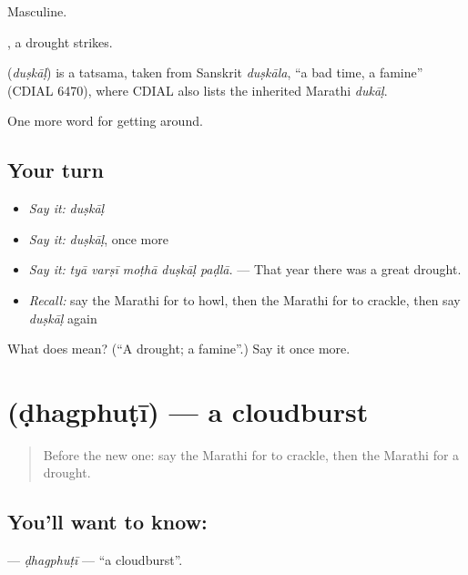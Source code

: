 Masculine.

 , a drought strikes.

\begin{cousinweb}
\textbf{} (\emph{duṣkāḷ}) is a tatsama, taken from Sanskrit \emph{duṣkāla}, \textquotedblleft{}a bad time, a famine\textquotedblright{} (CDIAL 6470), where CDIAL also lists the inherited Marathi \emph{dukāḷ}.
\end{cousinweb}

\begin{grammarlens}[title={What you've built}]
One more word for getting around.
\end{grammarlens}

\subsection*{Your turn}
\begin{itemize}
\raggedright
  \item \emph{Say it:} \emph{duṣkāḷ}
  \item \emph{Say it:} \emph{duṣkāḷ}, once more
  \item \emph{Say it:} \emph{tyā varṣī moṭhā duṣkāḷ paḍlā.} — That year there was a great drought.
  \item \emph{Recall:} say the Marathi for to howl, then the Marathi for to crackle, then say \emph{duṣkāḷ} again
\end{itemize}

\begin{tcolorbox}[breakable,colback=teal!4,colframe=teal!35!black,title={Before you move on}]
What does  mean? (\textquotedblleft{}A drought; a famine\textquotedblright{}.) Say it once more.
\end{tcolorbox}
\section[\texorpdfstring{\mr{ढगफुटी} (ḍhagphuṭī)}{ढगफुटी (ḍhagphuṭī)}]{ (ḍhagphuṭī) — a cloudburst}

\label{lesson:MR-C440-dhagphuti}



\begin{quote}
Before the new one: say the Marathi for to crackle, then the Marathi for a drought.
\end{quote}

\subsection*{You'll want to know: }
\textbf{} — \emph{ḍhagphuṭī} — \textquotedblleft{}a cloudburst\textquotedblright{}.


